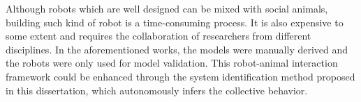Although robots which are well designed can be mixed with social animals, building such kind of robot is a time-consuming process. It is also expensive to some extent and requires the collaboration of researchers from different disciplines. In the aforementioned works, the models were manually derived and the robots were only used for model validation. This robot-animal interaction framework could be enhanced through the system identification method proposed in this dissertation, which autonomously infers the collective behavior. 

\clearpage 

